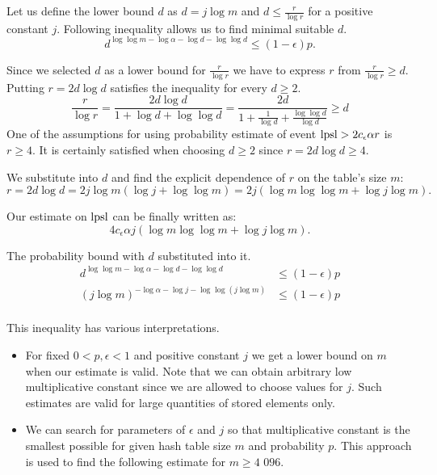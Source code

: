 Let us define the lower bound $d$ as $d = j \log m$ and $d \leq \frac{r}{\log r}$ for a positive constant $j$. Following inequality allows us to find minimal suitable $d$.
\[
d ^ {\log \log m - \log \alpha - \log d - \log \log d} \leq (1 - \epsilon) p \text{.}
\]

Since we selected $d$ as a lower bound for $\frac{r}{\log r}$ we have to express $r$ from $\frac{r}{\log r} \geq d$. Putting $r = 2 d \log d$ satisfies the inequality for every $d \geq 2$.
\begin{displaymath}
\frac{r}{\log r} = \frac{2 d \log d}{1 + \log d + \log \log d} = \frac{2 d}{1 + \frac{1}{\log d} + \frac{\log \log d}{\log d}} \geq d
\end{displaymath}
One of the assumptions for using probability estimate of event $\mathrm{lpsl} > 2 c_\epsilon \alpha r$ is $r \geq 4$. It is certainly satisfied when choosing $d \geq 2$ since $r = 2 d \log d \geq 4$.

We substitute into $d$ and find the explicit dependence of $r$ on the table's size $m$:
\begin{displaymath}
r = 2 d \log d = 2 j \log m (\log j + \log \log m) = 2 j (\log m \log \log m + \log j \log m) \text{.}
\end{displaymath}

Our estimate on $\mathrm{lpsl}$ can be finally written as:
\[
4 c_\epsilon \alpha j (\log m \log \log m + \log j \log m) \text{.}
\]

The probability bound with $d$ substituted into it.
\[
\begin{split}
d ^ {\log \log m - \log \alpha - \log d -\log \log d} & \leq (1 - \epsilon)p \\
\left(j \log m\right)^{-\log \alpha -\log j - \log \log (j \log m)} & \leq (1 - \epsilon)p \\
\end{split}
\]

This inequality has various interpretations.
\begin{itemize}
\item For fixed $0 < p, \epsilon < 1$ and positive constant $j$ we get a lower bound on $m$ when our estimate is valid. Note that we can obtain arbitrary low multiplicative constant since we are allowed to choose values for $j$. Such estimates are valid for large quantities of stored elements only.
\item We can search for parameters of $\epsilon$ and $j$ so that multiplicative constant is the smallest possible for given hash table size $m$ and probability $p$. This approach is used to find the following estimate for $m \geq \text{4 096}$.
\end{itemize}

